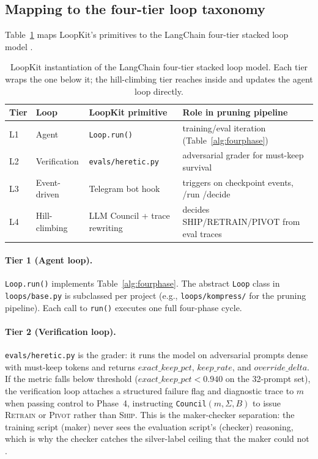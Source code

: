 \subsection{Mapping to the four-tier loop taxonomy}
\label{sec:loopkit:mapping}

Table~\ref{tab:loops} maps LoopKit's primitives to the LangChain four-tier
stacked loop model \citep{langchain2026loops}.

\begin{table}[h]
\centering
\caption{LoopKit instantiation of the LangChain four-tier stacked loop model.
Each tier wraps the one below it; the hill-climbing tier reaches inside and
updates the agent loop directly.}
\label{tab:loops}
\begin{tabular}{llll}
\toprule
Tier & Loop & LoopKit primitive & Role in pruning pipeline \\
\midrule
L1 & Agent        & \texttt{Loop.run()}              & training/eval iteration (Table~\ref{alg:fourphase}) \\
L2 & Verification & \texttt{evals/heretic.py}        & adversarial grader for must-keep survival \\
L3 & Event-driven & Telegram bot hook                & triggers on checkpoint events, /run /decide \\
L4 & Hill-climbing& LLM Council + trace rewriting    & decides SHIP/RETRAIN/PIVOT from eval traces \\
\bottomrule
\end{tabular}
\end{table}

\paragraph{Tier 1 (Agent loop).} \texttt{Loop.run()} implements
Table~\ref{alg:fourphase}. The abstract \texttt{Loop} class in
\texttt{loops/base.py} is subclassed per project (e.g.,
\texttt{loops/kompress/} for the pruning pipeline). Each call to
\texttt{run()} executes one full four-phase cycle.

\paragraph{Tier 2 (Verification loop).} \texttt{evals/heretic.py} is the
grader: it runs the model on adversarial prompts dense with must-keep tokens
and returns $\mathit{exact\_keep\_pct}$, $\mathit{keep\_rate}$, and
$\mathit{override\_delta}$. If the metric falls below threshold
($\mathit{exact\_keep\_pct} < 0.940$ on the 32-prompt set), the verification
loop attaches a structured failure flag and diagnostic trace to $m$ when
passing control to Phase~4, instructing \texttt{Council}$(m,\Sigma,B)$ to
issue \textsc{Retrain} or \textsc{Pivot} rather than \textsc{Ship}. This is the
maker-checker separation: the training script (maker) never sees the
evaluation script's (checker) reasoning, which is why the checker catches
the silver-label ceiling that the maker could not
\citep{osmani2026loop}.

